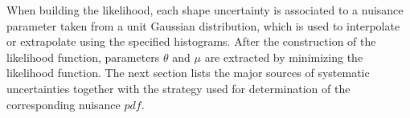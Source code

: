 When building the likelihood, each shape uncertainty is associated to a nuisance parameter taken from a unit Gaussian distribution, which is used to interpolate or extrapolate using the specified histograms. After the construction of the likelihood function, parameters $\theta$ and $\mu$ are extracted by minimizing the likelihood function. The next section lists the major sources of systematic uncertainties together with the strategy used for determination of the corresponding nuisance $pdf$.                                                                                                                                                                                                                                                                                                                                                                                                                                                                                                                                                                                                                                                                                                                                                                                                                                                                                                                                                                                                                                                                                                                                                                                                                                                                                                                                                                                                                                                                                                                                                                                                                                                                                                                                                                                                                                                                                                                                                                                                                                                                                                                                                                                                                                                                                                                                                        

